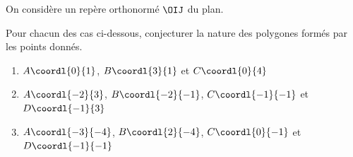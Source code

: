 \begin{exo}
	On considère un repère orthonormé $\OIJ$ du plan.

	Pour chacun des cas ci-dessous, conjecturer la nature des polygones formés par les points donnés.
	\begin{enumerate}
		\item $A\coordl{0}{1}$, $B\coordl{3}{1}$ et $C\coordl{0}{4}$
		\item $A\coordl{-2}{3}$, $B\coordl{-2}{-1}$, $C\coordl{-1}{-1}$ et $D\coordl{-1}{3}$
		\item $A\coordl{-3}{-4}$, $B\coordl{2}{-4}$, $C\coordl{0}{-1}$ et $D\coordl{-1}{-1}$
	\end{enumerate}
\end{exo}
